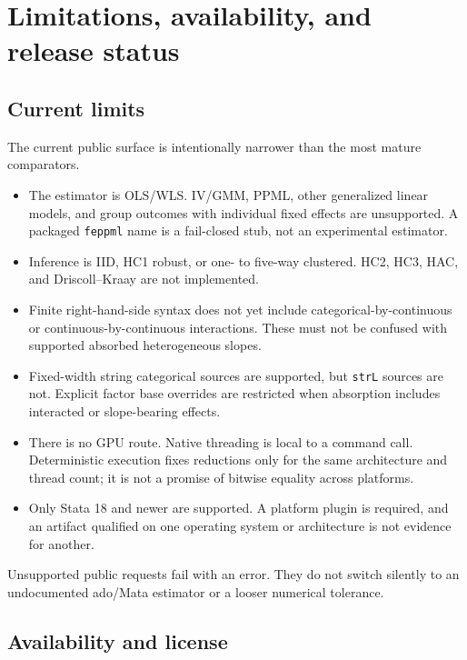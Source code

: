 \documentclass[11pt]{article}
\begin{document}
\section{Limitations, availability, and release status}
\label{sec:limits}

\subsection{Current limits}

The current public surface is intentionally narrower than the most mature
comparators.

\begin{itemize}
\item The estimator is OLS/WLS.  IV/GMM, PPML, other generalized linear
models, and group outcomes with individual fixed effects are unsupported.  A
packaged \texttt{feppml} name is a fail-closed stub, not an experimental
estimator.
\item Inference is IID, HC1 robust, or one- to five-way clustered.  HC2,
HC3, HAC, and Driscoll--Kraay are not implemented.
\item Finite right-hand-side syntax does not yet include
categorical-by-continuous or continuous-by-continuous interactions.  These
must not be confused with supported absorbed heterogeneous slopes.
\item Fixed-width string categorical sources are supported, but
\texttt{strL} sources are not.  Explicit factor base overrides are restricted
when absorption includes interacted or slope-bearing effects.
\item There is no GPU route.  Native threading is local to a command call.
Deterministic execution fixes reductions only for the same architecture and
thread count; it is not a promise of bitwise equality across platforms.
\item Only Stata 18 and newer are supported.  A platform plugin is required,
and an artifact qualified on one operating system or architecture is not
evidence for another.
\end{itemize}

Unsupported public requests fail with an error.  They do not switch silently
to an undocumented ado/Mata estimator or a looser numerical tolerance.

\subsection{Availability and license}
\end{document}
